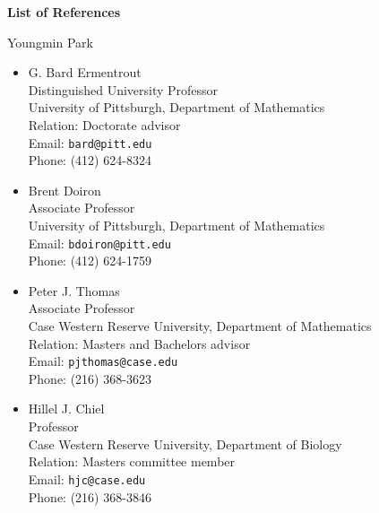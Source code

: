 \documentclass[a4paper,11pt]{article}
\begin{document}
\begin{center}
\Large \textbf{List of References}

\Large Youngmin Park
\end{center}

\begin{itemize}
 \item G. Bard Ermentrout\\
 Distinguished University Professor\\
 University of Pittsburgh, Department of Mathematics\\
 Relation: Doctorate advisor\\
 Email: \texttt{bard@pitt.edu}\\
 Phone: (412) 624-8324
 \item Brent Doiron\\
 Associate Professor\\
 University of Pittsburgh, Department of Mathematics\\
 Email: \texttt{bdoiron@pitt.edu}\\
 Phone: (412) 624-1759
 \item Peter J. Thomas\\
 Associate Professor\\
 Case Western Reserve University, Department of Mathematics\\
 Relation: Masters and Bachelors advisor\\
 Email: \texttt{pjthomas@case.edu}\\
 Phone: (216) 368-3623
 \item Hillel J. Chiel\\
 Professor\\
 Case Western Reserve University, Department of Biology\\
 Relation: Masters committee member\\
 Email: \texttt{hjc@case.edu}\\
 Phone: (216) 368-3846
\end{itemize}
\end{document}
